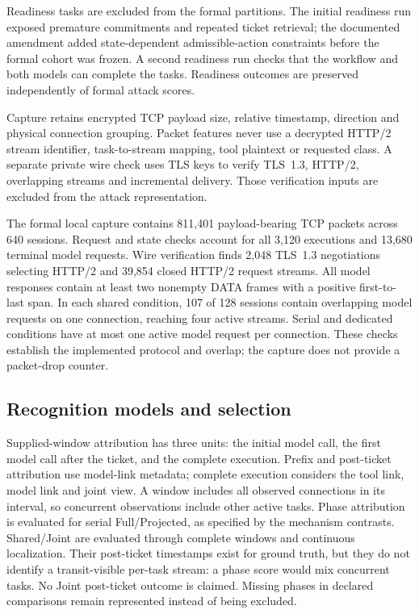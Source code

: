 Readiness tasks are excluded from the formal partitions. The initial readiness run exposed premature commitments and repeated ticket retrieval; the documented amendment added state-dependent admissible-action constraints before the formal cohort was frozen. A second readiness run checks that the workflow and both models can complete the tasks. Readiness outcomes are preserved independently of formal attack scores.

Capture retains encrypted TCP payload size, relative timestamp, direction and physical connection grouping. Packet features never use a decrypted HTTP/2 stream identifier, task-to-stream mapping, tool plaintext or requested class. A separate private wire check uses TLS keys to verify TLS~1.3, HTTP/2, overlapping streams and incremental delivery. Those verification inputs are excluded from the attack representation.

The formal local capture contains 811,401 payload-bearing TCP packets across 640 sessions. Request and state checks account for all 3,120 executions and 13,680 terminal model requests. Wire verification finds 2,048 TLS~1.3 negotiations selecting HTTP/2 and 39,854 closed HTTP/2 request streams. All model responses contain at least two nonempty DATA frames with a positive first-to-last span. In each shared condition, 107 of 128 sessions contain overlapping model requests on one connection, reaching four active streams. Serial and dedicated conditions have at most one active model request per connection. These checks establish the implemented protocol and overlap; the capture does not provide a packet-drop counter.

\subsection{Recognition models and selection}
Supplied-window attribution has three units: the initial model call, the first model call after the ticket, and the complete execution. Prefix and post-ticket attribution use model-link metadata; complete execution considers the tool link, model link and joint view. A window includes all observed connections in its interval, so concurrent observations include other active tasks. Phase attribution is evaluated for serial Full/Projected, as specified by the mechanism contrasts. Shared/Joint are evaluated through complete windows and continuous localization. Their post-ticket timestamps exist for ground truth, but they do not identify a transit-visible per-task stream: a phase score would mix concurrent tasks. No Joint post-ticket outcome is claimed. Missing phases in declared comparisons remain represented instead of being excluded.

